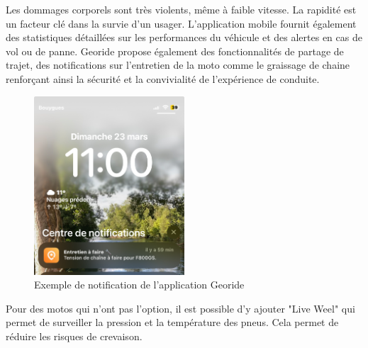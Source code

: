Les dommages corporels sont très violents, même à faible vitesse. La rapidité est un facteur clé dans la survie d'un usager. L’application mobile fournit également des statistiques détaillées sur les performances du véhicule et des alertes en cas de vol ou de panne. Georide propose également des fonctionnalités de partage de trajet, des notifications sur l'entretien de la moto comme le graissage de chaine renforçant ainsi la sécurité et la convivialité de l’expérience de conduite.
\begin{figure}[H]
    \centering
    \includegraphics[width=0.5\textwidth]{images/notification_georide.jpg} 
    \caption{Exemple de notification de l'application Georide}
\end{figure}
Pour des motos qui n'ont pas l'option, il est possible d'y ajouter "Live Weel" qui permet de surveiller la pression et la température des pneus. Cela permet de réduire les risques de crevaison.
\vspace{0.5cm}

